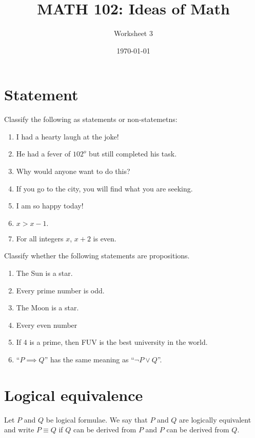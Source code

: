 \documentclass[12pt]{amsart}
\title{ MATH 102: Ideas  of Math }
\author{ Worksheet 3 }
\date{\today}
\begin{document}
\maketitle

\section{Statement}
\begin{problem}
    Classify the following as statements or non-statemetns:
    \begin{enumerate}
        \item I had a hearty laugh at the joke!
        \item He had a fever of $102^o$ but still completed his task.
        \item Why would anyone want to do this?
        \item If you go to the city, you will find what you are seeking.
        \item I am so happy today!
        \item $x > x-1.$
        \item For all integers $x$, $x+2$ is even.
    \end{enumerate}
\end{problem}

\begin{problem}
    Classify whether the following statements are propositions.
    \begin{enumerate}
        \item The Sun is a star.
        \item Every prime number is odd.
        \item The Moon is a star.
        \item Every even number
        \item If 4 is a prime, then FUV is the best university in the world.
        \item  ``$P \implies Q$'' has the same meaning as ``$\neg P \vee Q$''.
    \end{enumerate}
\end{problem}

\section{Logical equivalence}

\begin{definition}
    Let $P$ and $Q$ be logical formulae.
    We say that $P$ and $Q$ are logically equivalent and write $P\equiv Q$
    if $Q$ can be derived from $P$ and $P$ can be derived from $Q$.
\end{definition}
\end{document}
